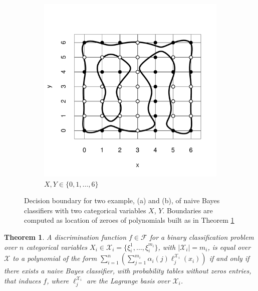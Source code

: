 \documentclass[11pt,a4paper, twoside]{book}
\newtheorem{theorem}{Theorem}[chapter]
\newcommand{\bchi}{\boldsymbol{\mathcal{X}}}
\newcommand{\nchi}{\mathcal{X}}
\begin{document}
\begin{figure}[h]
\begin{subfigure}[b]{0.45\textwidth}
\includegraphics[scale=0.4]{nb2}
\caption{ $X,Y \in \{0,1,\ldots,6\}$}
\end{subfigure}
\caption{Decision boundary for {two example}, (a) and (b), of naive Bayes classifiers with two categorical variables $X$, $Y$. {Boundaries are computed as location of zeroes of polynomials built as in Theorem \ref{teo: NB categorical}}}
\label{fig:decboundfig}
\end{figure}
\begin{theorem}
{A discrimination function $f \in\mathcal{F}$ for a binary classification problem} over $n$ categorical variables $X_i \in \nchi_i=\{\xi_i^1,\ldots,\xi_i^{m_i}\}$, with $|\nchi_i|=m_i$, is equal over $\bchi$ to a polynomial of the form $\sum_{i=1}^n \left( \sum_{j=1}^{m_i}  \alpha_{i}(j)\ell ^{\nchi_i} _j(x_i) \right)$ if and only if there exists a naive Bayes classifier, {with probability tables without zeros entries}, that induces $f$, where $\ell_j^{\nchi_i}$ are the Lagrange basis over $\nchi_i$.
\label{teo: NB categorical}
\end{theorem}
\end{document}

